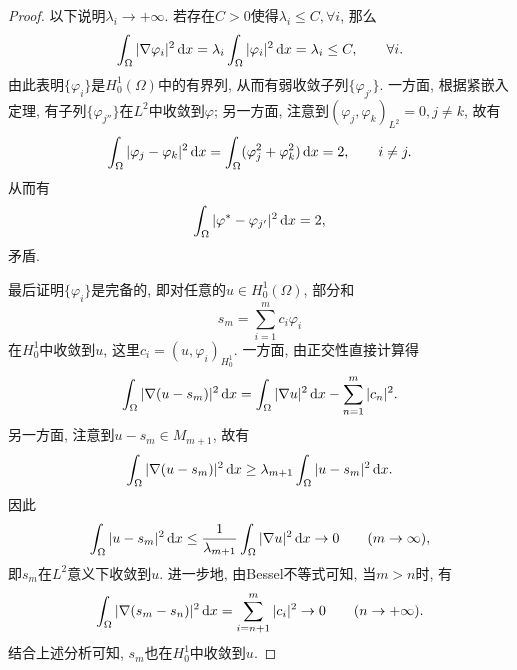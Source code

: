 \begin{theorem}
\begin{proof}
        以下说明$\lambda_i \rightarrow +\infty$. 若存在$C > 0$使得$\lambda_i \leq C, \forall i$, 那么 
        \begin{equation*}
            \int_{\Omega}|\nabla\varphi_i|^2 \,{\rm d}x = \lambda_i\int_{\Omega}|\varphi_i|^2 \,{\rm d}x = \lambda_i \leq C, \qquad \forall i.
        \end{equation*}
        由此表明$\{\varphi_i\}$是$H_0^1(\Omega)$中的有界列, 从而有弱收敛子列$\{\varphi_{j'}\}$.
        一方面, 根据紧嵌入定理, 有子列$\{\varphi_{j''}\}$在$L^2$中收敛到$\varphi$; 另一方面, 注意到$(\varphi_j, \varphi_k)_{L^2} = 0, j \neq k$, 故有 
        \begin{equation*}
            \int_{\Omega}|\varphi_j - \varphi_k|^2 \,{\rm d}x = \int_{\Omega}(\varphi_j^2 + \varphi_k^2) \,{\rm d}x = 2, \qquad i \neq j.
        \end{equation*}
        从而有 
        \begin{equation*}
            \int_{\Omega}|\varphi^* - \varphi_{j'}|^2 \,{\rm d}x = 2,
        \end{equation*}
        矛盾.

        最后证明$\{\varphi_i\}$是完备的, 即对任意的$u \in H_0^1(\Omega)$, 部分和
        \begin{equation*}
            s_m = \sum_{i = 1}^mc_i\varphi_i
        \end{equation*}
        在$H_0^1$中收敛到$u$, 这里$c_i = (u, \varphi_i)_{H_0^1}$. 一方面, 由正交性直接计算得 
        \begin{align*}
            \int_{\Omega}|\nabla(u - s_m)|^2 \,{\rm d}x = \int_{\Omega}|\nabla u|^2 \,{\rm d}x - \sum_{n = 1}^m|c_n|^2.
        \end{align*}
        另一方面, 注意到$u - s_m \in M_{m + 1}$, 故有 
        \begin{equation*}
            \int_{\Omega}|\nabla(u - s_m)|^2 \,{\rm d}x \geq \lambda_{m + 1}\int_{\Omega}|u - s_m|^2 \,{\rm d}x.
        \end{equation*}
        因此 
        \begin{equation*}
            \int_{\Omega}|u - s_m|^2 \,{\rm d}x \leq \frac{1}{\lambda_{m + 1}}\int_{\Omega}|\nabla u|^2 \,{\rm d}x \rightarrow 0 \qquad (m \rightarrow \infty),
        \end{equation*}
        即$s_m$在$L^2$意义下收敛到$u$. 进一步地, 由Bessel不等式可知, 当$m > n$时, 有 
        \begin{equation*}
            \int_{\Omega}|\nabla(s_m - s_n)|^2 \,{\rm d}x = \sum_{i = n + 1}^m|c_i|^2 \rightarrow 0 \qquad (n \rightarrow +\infty).
        \end{equation*}
        结合上述分析可知, $s_m$也在$H_0^1$中收敛到$u$.
    \end{proof}
\end{theorem}

